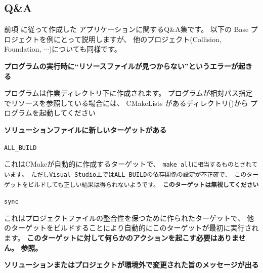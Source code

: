 \subsection{Q\&A}
\label{subsec:QandA}
\parindent=0pt

前項 に従って作成した
アプリケーションに関するQ\&A集です。
以下\SprLib の Base プロジェクトを例にとって説明しますが、
他のプロジェクト(Collision, Foundation, $\cdots$)についても同様です。

\bigskip

\thinrule{\linewidth}
\bf{プログラムの実行時に“リソースファイルが見つからない”というエラーが起きる}

\medskip
プログラムは作業ディレクトリ\BldDir 下に作成されます。
プログラムが相対パス指定でリソースを参照している場合には、
CMakeLists{} があるディレクトリ()から
プログラムを起動してください

\thinrule{\linewidth}
\bf{ソリューションファイルに新しいターゲットがある}

\tt{ALL\_BUILD}
\begin{narrow}
	これはCMakeが自動的に作成するターゲットで、
	\tt{make all}に相当するものとされています。
	ただしVisual Studio上では\tt{ALL\_BUILD}の依存関係の設定が不正確で、
	このターゲットをビルドしても正しい結果は得られないようです。
	\bf{このターゲットは無視してください}
\end{narrow}

\tt{sync}
\begin{narrow}
	これはプロジェクトファイルの整合性を保つために作られたターゲットで、
	他のターゲットをビルドすることにより自動的にこのターゲットが最初に実行されます。
	\bf{このターゲットに対して何らかのアクションを起こす必要はありません。}
	 参照。
\end{narrow}

\thinrule{\linewidth}
\bf{ソリューションまたはプロジェクトが環境外で変更された旨のメッセージが出る}

